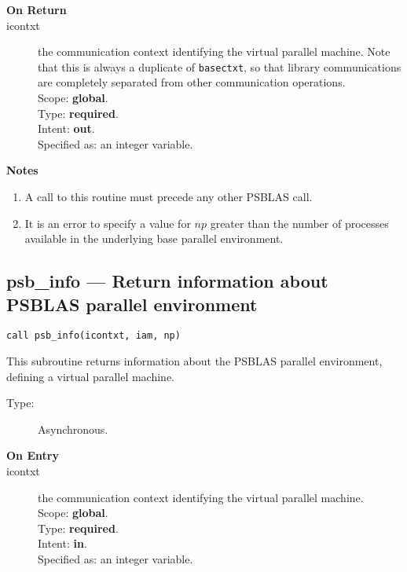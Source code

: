\begin{description}
\item[\bf On Return]
\item[icontxt] the communication context identifying the virtual
  parallel machine. Note that this is always a duplicate of
  \verb|basectxt|, so that library communications are completely
  separated from other communication operations.\\
Scope: {\bf global}.\\
Type: {\bf required}.\\
Intent: {\bf out}.\\
Specified as: an integer variable.
\end{description}


{\par\noindent\large\bfseries Notes}
\begin{enumerate}
\item A call to this routine must precede any other PSBLAS call. 
\item It is an error to specify a value for $np$ greater than the
  number of processes available in the underlying base parallel
  environment. 
\end{enumerate}


\clearpage\subsection*{psb\_info --- Return information about  PSBLAS parallel
  environment}

\begin{verbatim}
call psb_info(icontxt, iam, np)
\end{verbatim}

This subroutine returns information about  the PSBLAS parallel environment, defining
a virtual parallel machine.
\begin{description}
\item[Type:] Asynchronous.
\item[\bf  On Entry ]
\item[icontxt] the communication context identifying the virtual
  parallel machine.\\
Scope: {\bf global}.\\
Type: {\bf required}.\\
Intent: {\bf in}.\\
Specified as: an integer variable.
\end{description}

